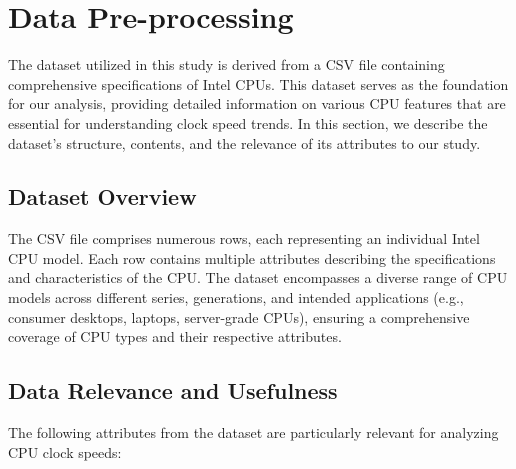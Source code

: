 \section{Data Pre-processing}
The dataset utilized in this study is derived from a CSV file containing comprehensive specifications of Intel CPUs. This dataset serves as the foundation for our analysis, providing detailed information on various CPU features that are essential for understanding clock speed trends. In this section, we describe the dataset's structure, contents, and the relevance of its attributes to our study.

\subsection{Dataset Overview}
The CSV file comprises numerous rows, each representing an individual Intel CPU model. Each row contains multiple attributes describing the specifications and characteristics of the CPU. The dataset encompasses a diverse range of CPU models across different series, generations, and intended applications (e.g., consumer desktops, laptops, server-grade CPUs), ensuring a comprehensive coverage of CPU types and their respective attributes.

\subsection{Data Relevance and Usefulness}
The following attributes from the dataset are particularly relevant for analyzing CPU clock speeds:

